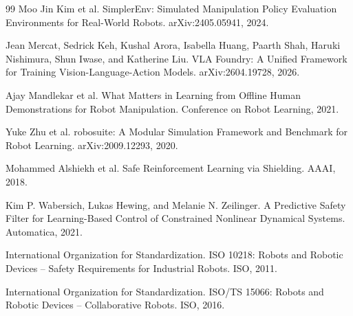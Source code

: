 \documentclass[11pt,oneside,openany]{oblivoir}
\numberwithin{section}{chapter}
\numberwithin{subsection}{section}
\numberwithin{equation}{chapter}
\begin{document}
\begin{thebibliography}{99}
Moo Jin Kim et al.
\newblock SimplerEnv: Simulated Manipulation Policy Evaluation Environments for Real-World Robots.
\newblock arXiv:2405.05941, 2024.

Jean Mercat, Sedrick Keh, Kushal Arora, Isabella Huang, Paarth Shah,
Haruki Nishimura, Shun Iwase, and Katherine Liu.
\newblock VLA Foundry: A Unified Framework for Training Vision-Language-Action Models.
\newblock arXiv:2604.19728, 2026.

Ajay Mandlekar et al.
\newblock What Matters in Learning from Offline Human Demonstrations for Robot Manipulation.
\newblock Conference on Robot Learning, 2021.

Yuke Zhu et al.
\newblock robosuite: A Modular Simulation Framework and Benchmark for Robot Learning.
\newblock arXiv:2009.12293, 2020.

Mohammed Alshiekh et al.
\newblock Safe Reinforcement Learning via Shielding.
\newblock AAAI, 2018.

Kim P. Wabersich, Lukas Hewing, and Melanie N. Zeilinger.
\newblock A Predictive Safety Filter for Learning-Based Control of Constrained Nonlinear Dynamical Systems.
\newblock Automatica, 2021.

International Organization for Standardization.
\newblock ISO 10218: Robots and Robotic Devices -- Safety Requirements for Industrial Robots.
\newblock ISO, 2011.

International Organization for Standardization.
\newblock ISO/TS 15066: Robots and Robotic Devices -- Collaborative Robots.
\newblock ISO, 2016.
\end{thebibliography}
\end{document}

